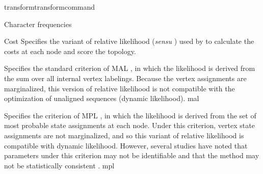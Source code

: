 \begin{command}{transform}{transformcommand}
\begin{arguments}
\begin{argumentgroup} {Character frequencies}
                    \end{argumentgroup}


	\begin {argumentgroup} {Cost}
	           Specifies the variant of relative likelihood (\textit{sensu}
                    \cite{steel2000parsimony}) used by \poy to calculate the costs at
                    each node and score the topology.

                            {Specifies the standard criterion of MAL \cite{felsenstein1981}, in which the
                            likelihood is derived from the sum over all internal
                            vertex labelings. Because the vertex assignments are
                            marginalized, this version of relative likelihood is not
                            compatible with the optimization of unaligned sequences (dynamic likelihood).}
                            {mal}

                            {Specifies the criterion of MPL \cite{barryandhartigan1987}, in which the likelihood is
                            derived from the set of most probable state assignments
                            at each node. Under this criterion, vertex state
                            assignments are not marginalized, and so this variant of
                            relative likelihood is compatible with dynamic
                            likelihood. However, several studies have noted that
                            parameters under this criterion may not be identifiable
                            \cite{zou2011} and that the method may not be statistically consistent
                            \cite{mossel2009shrinkage}.}
    			  {mpl}
		
		   \end{argumentgroup}
		   	  
                         

\end{arguments}
\end{command}
